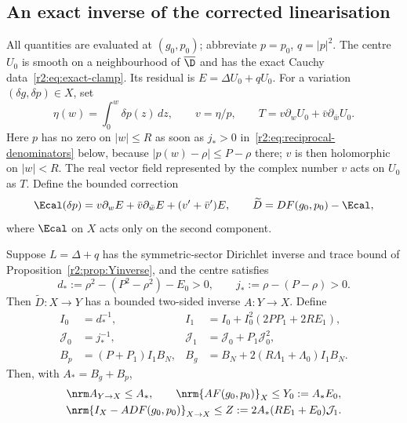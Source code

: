 \subsection{An exact inverse of the corrected linearisation}\label{r2:sec:linearization}

All quantities are evaluated at $(g_0,p_0)$; abbreviate $p=p_0$, $q=|p|^2$. The centre $U_0$ is smooth on a neighbourhood of $\overline\D$ and has the exact Cauchy data~\eqref{r2:eq:exact-clamp}. Its residual is $E=\Delta U_0+qU_0$. For a variation $(\delta g,\delta p)\in X$, set
\begin{equation}\label{r2:eq:variation}
 \eta(w)=\int_0^w\delta p(z)\,dz,\qquad
 v=\eta/p,
 \qquad T=v\partial_wU_0+\bar v\partial_{\bar w}U_0.
\end{equation}
Here $p$ has no zero on $|w|\le R$ as soon as $j_*>0$ in~\eqref{r2:eq:reciprocal-denominators} below, because $|p(w)-\rho|\le P-\rho$ there; $v$ is then holomorphic on $|w|<R$. The real vector field represented by the complex number $v$ acts on $U_0$ as $T$. Define the bounded correction
\begin{equation}\label{r2:eq:residual-correction}
 \Ecal(\delta p)=v\partial_wE+\bar v\partial_{\bar w}E+(v'+\bar v')E,
 \qquad \widetilde D=DF(g_0,p_0)-\Ecal,
\end{equation}
where $\Ecal$ on $X$ acts only on the second component.

\begin{proposition}\label{r2:prop:coupled}
Suppose $L=\Delta+q$ has the symmetric-sector Dirichlet inverse and trace bound of Proposition~\ref{r2:prop:Yinverse}, and the centre satisfies
\begin{equation}\label{r2:eq:reciprocal-denominators}
 d_*:=\rho^2-(P^2-\rho^2)-E_0>0,
 \qquad j_*:=\rho-(P-\rho)>0.
\end{equation}
Then $\widetilde D\colon X\to Y$ has a bounded two-sided inverse $A\colon Y\to X$. Define
\begin{align}
 I_0&=d_*^{-1},& I_1&=I_0+I_0^2(2PP_1+2RE_1),\label{r2:eq:I}\\
 \mathcal J_0&=j_*^{-1},& \mathcal J_1&=\mathcal J_0+P_1\mathcal J_0^2,\label{r2:eq:J}\\
 B_p&=(P+P_1)I_1B_N,&
 B_g&=B_N+2(R\Lambda_1+\Lambda_0)I_1B_N.\label{r2:eq:BgBp}
\end{align}
Then, with $A_*=B_g+B_p$,
\begin{equation}\label{r2:eq:A-defects}
 \begin{gathered}
 \nrm A_{Y\to X}\le A_*,\qquad
 \nrm{AF(g_0,p_0)}_X\le Y_0:=A_*E_0,\\
 \nrm{I_X-A DF(g_0,p_0)}_{X\to X}
 \le Z:=2A_*(RE_1+E_0)\mathcal J_1.
 \end{gathered}
\end{equation}
\end{proposition}

